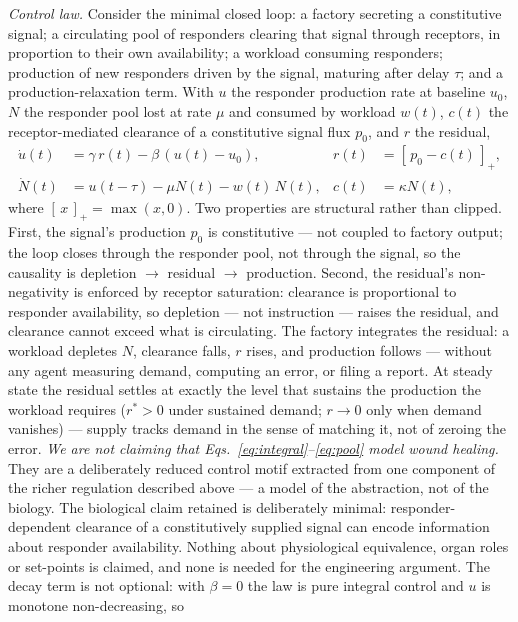 \documentclass[twoside,twocolumn,usenatbib]{mnras}
\begin{document}
\emph{Control law.} Consider the minimal closed loop: a factory
secreting a constitutive signal; a circulating pool of responders
clearing that signal through receptors, in proportion to their own
availability; a workload consuming responders; production of new
responders driven by the signal, maturing after delay $\tau$; and a
production-relaxation term. With $u$ the responder production rate at
baseline $u_0$, $N$ the responder pool lost at rate $\mu$ and consumed
by workload $w(t)$, $c(t)$ the receptor-mediated clearance of a
constitutive signal flux $p_0$, and $r$ the residual,
\begin{align}
\dot{u}(t) &= \gamma\, r(t) - \beta\,(u(t) - u_0), &
r(t) &= [\,p_0 - c(t)\,]_+,
\label{eq:integral}\\
\dot{N}(t) &= u(t - \tau) - \mu N(t) - w(t)\,N(t), &
c(t) &= \kappa N(t),
\label{eq:pool}
\end{align}
where $[\,x\,]_+ = \max(x, 0)$. Two properties are structural rather
than clipped. First, the signal's production $p_0$ is constitutive ---
not coupled to factory output; the loop closes through the responder
pool, not through the signal, so the causality is depletion $\to$
residual $\to$ production. Second, the residual's non-negativity is
enforced by receptor saturation: clearance is proportional to
responder availability, so depletion --- not instruction --- raises
the residual, and clearance cannot exceed what is circulating. The
factory integrates the residual: a workload depletes $N$, clearance
falls, $r$ rises, and production follows --- without any agent
measuring demand, computing an error, or filing a report. At steady
state the residual settles at exactly the level that sustains the
production the workload requires ($r^{*} > 0$ under sustained demand;
$r \to 0$ only when demand vanishes) --- supply tracks demand in the
sense of matching it, not of zeroing the error. \emph{We are not
claiming that
Eqs.~\ref{eq:integral}--\ref{eq:pool} model wound healing.} They are a
deliberately reduced control motif extracted from one component of the
richer regulation described above --- a model of the abstraction, not
of the biology. The biological claim retained is deliberately minimal:
responder-dependent clearance of a constitutively supplied signal can
encode information about responder availability. Nothing about
physiological equivalence, organ roles or set-points is claimed, and
none is needed for the engineering argument. The decay term is not optional: with $\beta = 0$ the
law is pure integral control and $u$ is monotone non-decreasing, so
\end{document}
